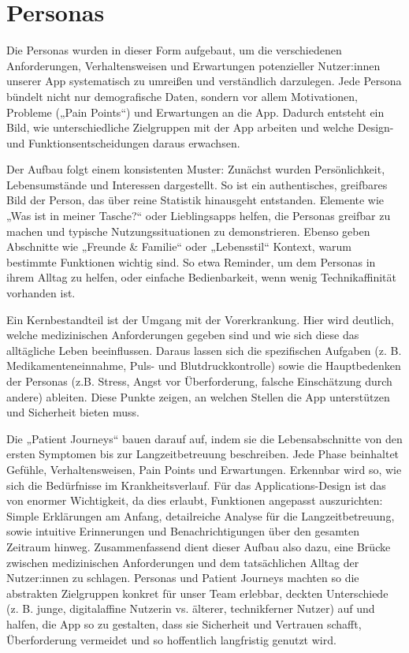 \section{Personas}
Die Personas wurden in dieser Form aufgebaut, um die verschiedenen Anforderungen, Verhaltensweisen und Erwartungen potenzieller Nutzer:innen unserer App systematisch zu umreißen und verständlich darzulegen. Jede Persona bündelt nicht nur demografische Daten, sondern vor allem Motivationen, Probleme („Pain Points“) und Erwartungen an die App. Dadurch entsteht ein Bild, wie unterschiedliche Zielgruppen mit der App arbeiten und welche Design- und Funktionsentscheidungen daraus erwachsen.

Der Aufbau folgt einem konsistenten Muster: Zunächst wurden Persönlichkeit, Lebensumstände und Interessen dargestellt. So ist ein authentisches, greifbares Bild der Person, das über reine Statistik hinausgeht entstanden. Elemente wie „Was ist in meiner Tasche?“ oder Lieblingsapps helfen, die Personas greifbar zu machen und typische Nutzungssituationen zu demonstrieren. Ebenso geben Abschnitte wie „Freunde \& Familie“ oder „Lebensstil“ Kontext, warum bestimmte Funktionen wichtig sind. So etwa Reminder, um dem Personas in ihrem Alltag zu helfen, oder einfache Bedienbarkeit, wenn wenig Technikaffinität vorhanden ist.

Ein Kernbestandteil ist der Umgang mit der Vorerkrankung. Hier wird deutlich, welche medizinischen Anforderungen gegeben sind und wie sich diese das alltägliche Leben beeinflussen. Daraus lassen sich die spezifischen Aufgaben (z. B. Medikamenteneinnahme, Puls- und Blutdruckkontrolle) sowie die Hauptbedenken der Personas (z.B. Stress, Angst vor Überforderung, falsche Einschätzung durch andere) ableiten. Diese Punkte zeigen, an welchen Stellen die App unterstützen und Sicherheit bieten muss.

Die „Patient Journeys“ bauen darauf auf, indem sie die Lebensabschnitte von den ersten Symptomen bis zur Langzeitbetreuung beschreiben. Jede Phase beinhaltet Gefühle, Verhaltensweisen, Pain Points und Erwartungen. Erkennbar wird so, wie sich die Bedürfnisse im Krankheitsverlauf. Für das Applications-Design ist das von enormer Wichtigkeit, da dies erlaubt, Funktionen angepasst auszurichten: Simple Erklärungen am Anfang, detailreiche Analyse für die Langzeitbetreuung, sowie intuitive Erinnerungen und Benachrichtigungen über den gesamten Zeitraum hinweg.
Zusammenfassend dient dieser Aufbau also dazu, eine Brücke zwischen medizinischen Anforderungen und dem tatsächlichen Alltag der Nutzer:innen zu schlagen. Personas und Patient Journeys machten so die abstrakten Zielgruppen konkret für unser Team erlebbar, deckten Unterschiede (z. B. junge, digitalaffine Nutzerin vs. älterer, technikferner Nutzer) auf und halfen, die App so zu gestalten, dass sie Sicherheit und Vertrauen schafft, Überforderung vermeidet und so hoffentlich langfristig genutzt wird.

